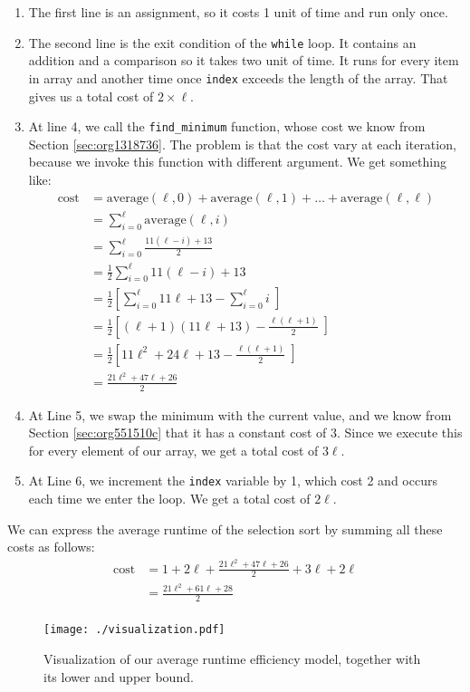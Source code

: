 \documentclass[11pt]{article}
\begin{document}
\begin{enumerate}
\item The first line is an assignment, so it costs 1 unit of time and
run only once.

\item The second line is the exit condition of the \texttt{while} loop. It
contains an addition and a comparison so it takes two unit of
time. It runs for every item in array and another time once
\texttt{index} exceeds the length of the array. That gives us a total
cost of \(2 \times \ell\).

\item At line 4, we call the \texttt{find\_minimum} function, whose cost we
know from Section \ref{sec:org1318736}. The problem is
that the cost vary at each iteration, because we invoke this
function with different argument. We get something like:
\begin{align*}
    \text{cost} & = \text{average}(\ell, 0) + \text{average}(\ell, 1) + \ldots + \text{average}(\ell, \ell) \\
                & = \sum_{i=0}^{\ell} \text{average}(\ell, i) \\
                & = \sum_{i=0}^{\ell} \frac{11(\ell-i) + 13}{2}\\
                & = \frac{1}{2} \sum_{i=0}^{\ell} 11(\ell-i) + 13\\
                & = \frac{1}{2} \left[ \sum_{i=0}^{\ell} 11\ell + 13 - \sum_{i=0}^{\ell} i \left] \\
                & = \frac{1}{2} \left[ (\ell+1)(11\ell + 13) - \frac{\ell(\ell+1)}{2} \left] \\
                & = \frac{1}{2} \left[ 11\ell^2 + 24\ell +13 - \frac{\ell(\ell+1)}{2} \left] \\
                & = \frac{21\ell^2+47\ell+26}{2}
\end{align*}

\item At Line 5, we swap the minimum with the current value, and we
know from Section \ref{sec:org551510c} that it has a constant cost
of 3. Since we execute this for every element of our array, we
get a total cost of \(3\ell\).

\item At Line 6, we increment the \texttt{index} variable by 1, which cost 2
and occurs each time we enter the loop. We get a total cost of
\(2\ell\).
\end{enumerate}

We can express the average runtime of the selection sort by summing
all these costs as follows:
\begin{align*}
   \text{cost} & = 1 + 2\ell + \frac{21\ell^2+47\ell+26}{2} + 3\ell + 2 \ell \\
               & =\frac{21\ell^2+61\ell+28}{2} \\
\end{align*}



\begin{figure}[htbp]
\centering
\texttt{[image: ./visualization.pdf]}
\caption{\label{fig:org4c8c38d}Visualization of our average runtime efficiency model, together with its lower and upper bound.}
\end{figure}
\end{document}
